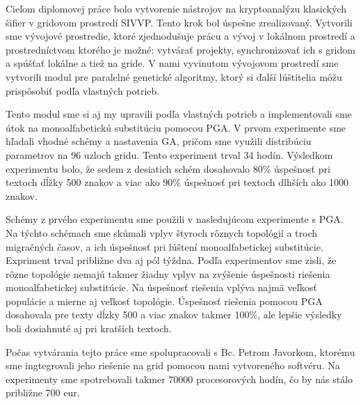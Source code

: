 
Cieľom diplomovej práce bolo vytvorenie nástrojov na kryptoanalýzu klasických šifier v gridovom prostredí SIVVP.
Tento krok bol úspešne zrealizovaný. Vytvorili sme vývojové prostredie, ktoré zjednodušuje prácu a vývoj v lokálnom prostredí
a prostredníctvom ktorého je možné: vytvárať projekty,  synchronizovať ich s gridom a spúšťať lokálne a tiež na gride.
V nami vyvinutom vývojovom prostredí sme vytvorili modul pre paralelné genetické algoritmy,
ktorý si ďalší lúštitelia môžu prispôsobiť podľa vlastných potrieb.

Tento modul sme si aj my upravili podľa vlastných potrieb a implementovali sme útok na monoalfabetickú substitúciu pomocou PGA.
V prvom experimente sme hľadali vhodné schémy a nastavenia GA, pričom sme využili distribúciu parametrov na 96 uzloch gridu.
Tento experiment trval 34 hodín. Výsledkom experimentu bolo, že sedem z desiatich schém dosahovalo 80\% úspešnosť pri textoch
dĺžky 500 znakov a viac ako 90\% úspešnosť pri textoch dlhších ako 1000 znakov.

Schémy z prvého experimentu sme použili v nasledujúcom experimente s PGA.
Na týchto schémach sme skúmali vplyv štyroch rôznych topológií a troch migračných časov, a ich úspešnosť pri lúštení
monoalfabetickej substitúcie.
Expriment trval približne dva aj pól týždna.
Podľa experimentov sme zisli, že rôzne topológie nemajú takmer žiadny vplyv na zvýšenie úspešnosti riešenia monoalfabetickej substitúcie.
Na úspešnosť riešenia vplýva najmä veľkosť populácie a mierne aj veľkosť topológie.     
Úspešnosť riešenia pomocou PGA dosahovala pre texty dĺzky 500 a viac znakov takmer 100\%, ale lepšie výsledky boli dosiahnuté aj pri kratších textoch.

Počas vytvárania tejto práce sme spolupracovali s Bc. Petrom Javorkom, ktorému sme ingtegrovali jeho riešenie na grid pomocou nami vytvoreného softvéru.
Na experimenty sme spotrebovali takmer 70000 procesorových hodín, čo by nás stálo približne 700 eur.
